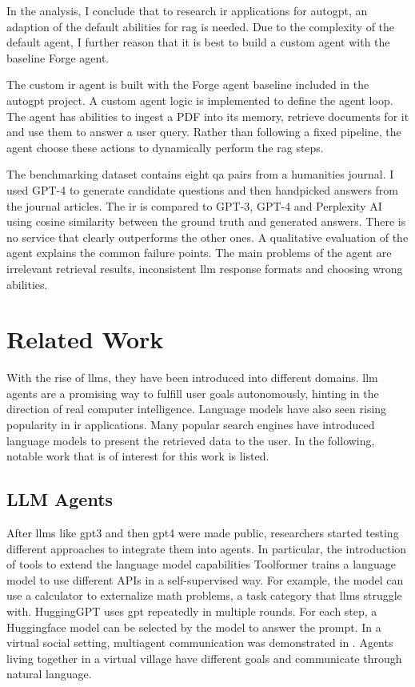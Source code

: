 \documentclass[../main.tex]{subfiles}
\begin{document}
In the analysis, I conclude that to research \gls{ir} applications for \gls{autogpt},
an adaption of the default abilities for \gls{rag} is needed.
Due to the complexity of the default agent,
I further reason that it is best to build a custom agent with the baseline Forge agent.

The custom \gls{ir} agent is built with the Forge agent baseline included in the
\gls{autogpt} project.
A custom agent logic is implemented to define the agent loop.
The agent has abilities to ingest a PDF into its memory, retrieve documents for it
and use them to answer a user query.
Rather than following a fixed pipeline, the agent choose these actions to
dynamically perform the \gls{rag} steps.

The benchmarking dataset contains eight \gls{qa} pairs from a humanities journal.
I used GPT-4 to generate candidate questions and then handpicked answers from
the journal articles.
The \gls{ir} is compared to GPT-3, GPT-4 and Perplexity AI
using cosine similarity between the ground truth and generated answers.
There is no service that clearly outperforms the other ones.
A qualitative evaluation of the agent explains the common failure points.
The main problems of the agent are irrelevant retrieval results,
inconsistent \gls{llm} response formats and choosing wrong abilities.

\section{Related Work}

With the rise of \glspl{llm}, they have been introduced into different domains.
\Gls{llm} agents are a promising way to fulfill user goals autonomously,
hinting in the direction of real computer intelligence.
Language models have also seen rising popularity in \gls{ir} applications.
Many popular search engines have introduced language models to present the retrieved data to the user.
In the following, notable work that is of interest for this work is listed.

\subsection{LLM Agents}

After \glspl{llm} like \gls{gpt3} and then \gls{gpt4} were made public,
researchers started testing different approaches to integrate them into agents.
In particular, the introduction of tools to extend the language model capabilities
Toolformer \cite{Schick2023} trains a language model to use different APIs in a self-supervised way.
For example, the model can use a calculator to externalize math problems,
a task category that \glspl{llm} struggle with.
HuggingGPT \cite{Shen2023} uses \gls{gpt} repeatedly in multiple rounds.
For each step, a Huggingface model can be selected by the model to answer the prompt.
In a virtual social setting, multiagent communication was demonstrated in \autocite{Park2023}.
Agents living together in a virtual village have different goals and communicate through natural language.
\end{document}
